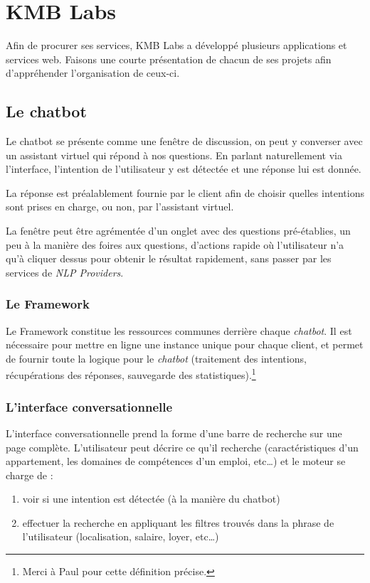 \documentclass[12pt,a4paper,oneside]{scrreprt}
\begin{document}
\chapter{KMB Labs}
Afin de procurer ses services, KMB Labs a développé plusieurs applications et services web. Faisons une courte présentation de chacun de ses projets afin d'appréhender l'organisation de ceux-ci.

\section{Le chatbot}

Le chatbot se présente comme une fenêtre de discussion, on peut y converser avec un assistant virtuel qui répond à nos questions. En parlant naturellement via l'interface, l'intention de l'utilisateur y est détectée et une réponse lui est donnée.

La réponse est préalablement fournie par le client afin de choisir quelles intentions sont prises en charge, ou non, par l'assistant virtuel.

La fenêtre peut être agrémentée d'un onglet avec des questions pré-établies, un peu à la manière des foires aux questions, d'actions rapide où l'utilisateur n'a qu'à cliquer dessus pour obtenir le résultat rapidement, sans passer par les services de \textit{NLP Providers}.

\subsection{Le Framework}

Le Framework constitue les ressources communes derrière chaque \textit{chatbot}. Il est nécessaire pour mettre en ligne une instance unique pour chaque client, et permet de fournir toute la logique pour le \textit{chatbot} (traitement des intentions, récupérations des réponses, sauvegarde des statistiques).\footnote{Merci à Paul pour cette définition précise.}

\subsection*{L'interface conversationnelle}
L'interface conversationnelle prend la forme d'une barre de recherche sur une page complète. L'utilisateur peut décrire ce qu'il recherche (caractéristiques d'un appartement, les domaines de compétences d'un emploi, etc\dots) et le moteur se charge de :
\begin{enumerate}
	\item voir si une intention est détectée (à la manière du chatbot)
	\item effectuer la recherche en appliquant les filtres trouvés dans la phrase de l'utilisateur (localisation, salaire, loyer, etc\dots)
\end{enumerate}
\end{document}
